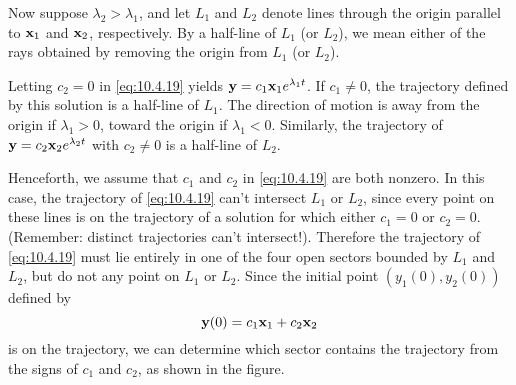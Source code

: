 \documentclass{ximera}
\begin{document}

Now suppose   $\lambda_2>\lambda_1$, and let $L_1$ and $L_2$ denote
lines through the origin parallel to ${\bf x}_1$ and ${\bf x}_2$,
respectively. By a half-line of $L_1$ (or $L_2$), we mean either of the
rays obtained by removing the origin from $L_1$ (or $L_2$).

Letting $c_2=0$ in \eqref{eq:10.4.19} yields ${\bf y}=c_1{\bf
x}_1e^{\lambda_1 t}$. If $c_1\neq 0$, the trajectory defined by this
solution is a half-line of $L_1$. The direction of motion is away from
the origin if $\lambda_1>0$, toward the origin if $\lambda_1<0$.
Similarly, the trajectory of  ${\bf y}=c_2{\bf x}_2e^{\lambda_2 t}$
with $c_2\neq 0$ is a half-line of $L_2$.

Henceforth, we assume that $c_1$ and $c_2$ in \eqref{eq:10.4.19} are both
nonzero. In this case, the trajectory of \eqref{eq:10.4.19} can't
intersect
$L_1$ or $L_2$, since every point on these lines is on the trajectory
of a solution for which either $c_1=0$ or $c_2=0$. (Remember: distinct
trajectories can't intersect!). Therefore the trajectory of
\eqref{eq:10.4.19} must lie entirely in one of the four open sectors
bounded by $L_1$ and $L_2$, but do not any point  on $L_1$ or
$L_2$. Since the initial point $(y_1(0),y_2(0))$ defined by
$$
{\bf y}(0)=c_1{\bf x}_1+c_2{\bf x}_2
$$
is on the trajectory, we can determine which sector contains the
trajectory from the signs of $c_1$ and $c_2$,
as shown in the figure.

\begin{center}
\end{center}

\end{document}
